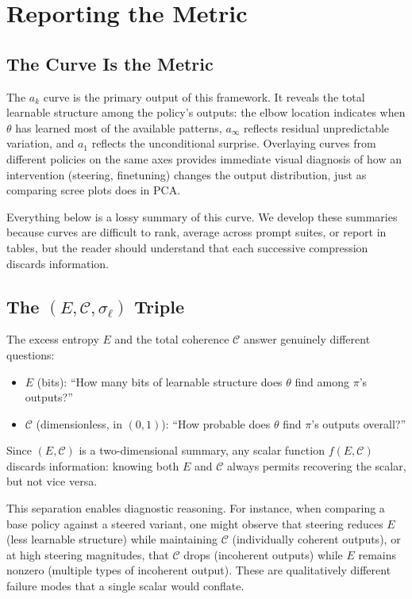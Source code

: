 \documentclass[11pt]{article}
\begin{document}
\section{Reporting the Metric}

\subsection{The Curve Is the Metric}

The $a_k$ curve is the primary output of this framework. It reveals the total learnable structure among the policy's outputs: the elbow location indicates when $\theta$ has learned most of the available patterns, $a_\infty$ reflects residual unpredictable variation, and $a_1$ reflects the unconditional surprise. Overlaying curves from different policies on the same axes provides immediate visual diagnosis of how an intervention (steering, finetuning) changes the output distribution, just as comparing scree plots does in PCA.

Everything below is a lossy summary of this curve. We develop these summaries because curves are difficult to rank, average across prompt suites, or report in tables, but the reader should understand that each successive compression discards information.

\subsection{The \texorpdfstring{$(E, \mathcal{C}, \sigma_\ell)$}{(E, C, sigma)} Triple}

The excess entropy $E$ and the total coherence $\mathcal{C}$ answer genuinely different questions:
\begin{itemize}[nosep]
    \item $E$ (bits): ``How many bits of learnable structure does $\theta$ find among $\pi$'s outputs?''
    \item $\mathcal{C}$ (dimensionless, in $(0,1)$): ``How probable does $\theta$ find $\pi$'s outputs overall?''
\end{itemize}

Since $(E, \mathcal{C})$ is a two-dimensional summary, any scalar function $f(E, \mathcal{C})$ discards information: knowing both $E$ and $\mathcal{C}$ always permits recovering the scalar, but not vice versa.

This separation enables diagnostic reasoning. For instance, when comparing a base policy against a steered variant, one might observe that steering reduces $E$ (less learnable structure) while maintaining $\mathcal{C}$ (individually coherent outputs), or at high steering magnitudes, that $\mathcal{C}$ drops (incoherent outputs) while $E$ remains nonzero (multiple types of incoherent output). These are qualitatively different failure modes that a single scalar would conflate.
\end{document}

